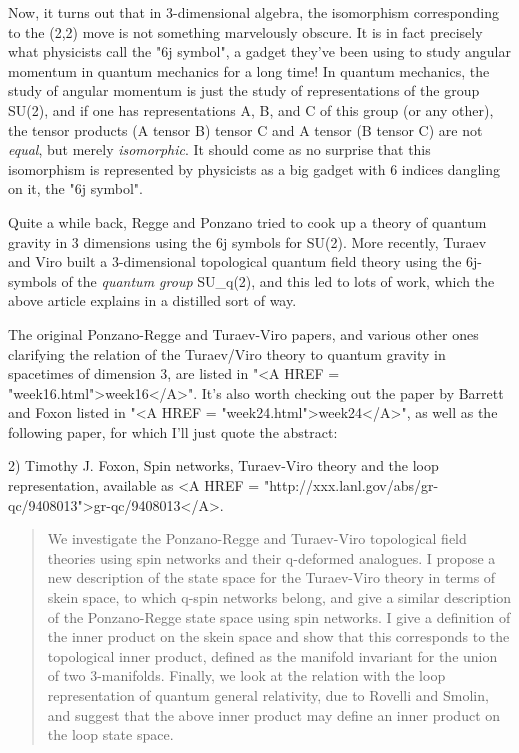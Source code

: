 Now, it turns out that in 3-dimensional algebra, the isomorphism
corresponding to the (2,2) move is not something marvelously obscure.
It is in fact precisely what physicists call the "6j symbol", a gadget
they've been using to study angular momentum in quantum mechanics for a
long time!  In quantum mechanics, the study of angular momentum is just
the study of representations of the group SU(2), and if one has
representations A, B, and C of this group (or any other), the tensor
products (A tensor B) tensor C and A tensor (B tensor C) are not
\emph{equal}, but merely \emph{isomorphic}.  
It should come as no surprise that
this isomorphism is represented by physicists as a big gadget with 6
indices dangling on it, the "6j symbol".

Quite a while back, Regge and Ponzano tried to cook up a theory of
quantum gravity in 3 dimensions using the 6j symbols for SU(2).  More
recently, Turaev and Viro built a 3-dimensional topological quantum
field theory using the 6j-symbols of the \emph{quantum group} 
SU_{q}(2), and
this led to lots of work, which the above article explains in a
distilled sort of way.

The original Ponzano-Regge and Turaev-Viro papers, and various other
ones clarifying the relation of the Turaev/Viro theory to quantum
gravity in spacetimes of dimension 3, are listed in "<A HREF = "week16.html">week16</A>".  It's also
worth checking out the paper by Barrett and Foxon listed in "<A HREF = "week24.html">week24</A>", as
well as the following paper, for which I'll just quote the abstract:

2) Timothy J. Foxon, Spin networks, Turaev-Viro theory and the loop 
representation, available as 
<A HREF = "http://xxx.lanl.gov/abs/gr-qc/9408013">gr-qc/9408013</A>.

\begin{quote}

We investigate the Ponzano-Regge and Turaev-Viro topological field theories
using spin networks and their q-deformed analogues. I propose a new
description of the state space for the Turaev-Viro theory in terms of skein
space, to which q-spin networks belong, and give a similar description of
the Ponzano-Regge state space using spin networks.
I give a definition of the inner product on the skein space and show
that this corresponds to the topological inner product, defined as the
manifold invariant for the union of two 3-manifolds.
Finally, we look at the relation with the loop representation of quantum
general relativity, due to Rovelli and Smolin, and suggest that the above
inner product may define an inner product on the loop state space.
\end{quote}
    

